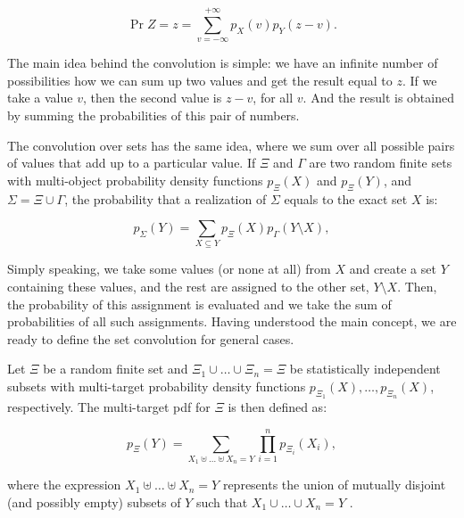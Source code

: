 \begin{equation}
    \Pr{Z = z} = \sum_{v = -\infty}^{+\infty} p_X(v) p_Y(z - v).
\end{equation}

The main idea behind the convolution is simple: we have an infinite number of possibilities how we can sum up two values and get the result equal to $z$. If we take a value $v$, then the second value is $z-v$, for all $v$. And the result is obtained by summing the probabilities of this pair of numbers.

The convolution over sets has the same idea, where we sum over all possible pairs of values that add up to a particular value. If $\Xi$ and $\Gamma$ are two random finite sets with multi-object probability density functions $p_\Xi(X)$ and $p_\Xi(Y)$, and $\Sigma = \Xi \cup \Gamma$, the probability that a realization of $\Sigma$ equals to the exact set $X$ is:

\begin{equation}
    p_\Sigma(Y) = \sum_{X \subseteq Y} p_\Xi(X) p_\Gamma(Y \setminus X),
\end{equation}

Simply speaking, we take some values (or none at all) from $X$ and create a set $Y$ containing these values, and the rest are assigned to the other set, $Y \setminus X$. Then, the probability of this assignment is evaluated and we take the sum of probabilities of all such assignments. Having understood the main concept, we are ready to define the set convolution for general cases.

\begin{definition}\label{def:rfs-convolution}
    Let $\Xi$ be a random finite set and $\Xi_1 \cup \ldots \cup \Xi_n = \Xi$ be statistically independent subsets with multi-target probability density functions $p_{\Xi_1}(X), \ldots, p_{\Xi_n}(X)$, respectively. The multi-target pdf for $\Xi$ is then defined as:

    \begin{equation}
        p_\Xi(Y) = \sum_{X_1 \uplus \ldots \uplus X_n = Y} \prod_{i=1}^{n} p_{\Xi_i}(X_i),
    \end{equation}
    
    where the expression $X_1 \uplus \ldots \uplus X_n = Y$ represents the union of mutually disjoint (and possibly empty) subsets of $Y$ such that $X_1 \cup \ldots \cup X_n = Y$ \cite[385--386]{mahlerStatisticalMultisourcemultitargetInformation2007}.
\end{definition}

